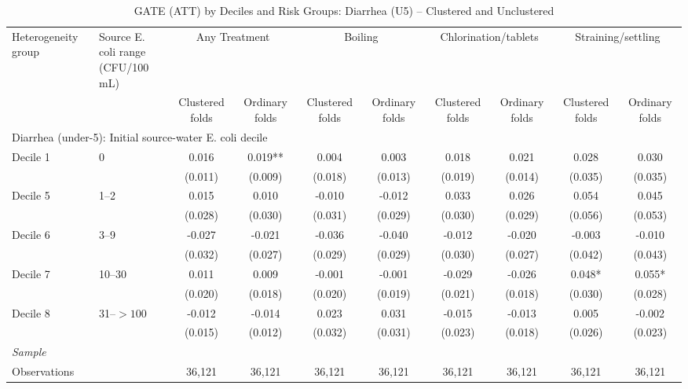 \begin{landscape}
\begin{table}[p]
\centering
\caption{GATE (ATT) by Deciles and Risk Groups: Diarrhea (U5) -- Clustered and Unclustered}
\label{tab:table_gate_appendix-diarrhea}
\scriptsize\setlength{\tabcolsep}{4pt}
\begin{adjustbox}{max width=\linewidth, center}
\begin{tabular}{llcccccccc}
\toprule
Heterogeneity group & \shortstack{Source E. coli range\\(CFU/100 mL)} & \multicolumn{2}{c}{Any Treatment} & \multicolumn{2}{c}{Boiling} & \multicolumn{2}{c}{Chlorination/tablets} & \multicolumn{2}{c}{Straining/settling} \\
 &  & Clustered folds & Ordinary folds & Clustered folds & Ordinary folds & Clustered folds & Ordinary folds & Clustered folds & Ordinary folds \\
\midrule
\multicolumn{10}{l}{Diarrhea (under-5): Initial source-water E. coli decile} \\
Decile 1 & 0 & 0.016 & 0.019** & 0.004 & 0.003 & 0.018 & 0.021 & 0.028 & 0.030 \\
 &  & (0.011) & (0.009) & (0.018) & (0.013) & (0.019) & (0.014) & (0.035) & (0.035) \\
Decile 5 & 1--2 & 0.015 & 0.010 & -0.010 & -0.012 & 0.033 & 0.026 & 0.054 & 0.045 \\
 &  & (0.028) & (0.030) & (0.031) & (0.029) & (0.030) & (0.029) & (0.056) & (0.053) \\
Decile 6 & 3--9 & -0.027 & -0.021 & -0.036 & -0.040 & -0.012 & -0.020 & -0.003 & -0.010 \\
 &  & (0.032) & (0.027) & (0.029) & (0.029) & (0.030) & (0.027) & (0.042) & (0.043) \\
Decile 7 & 10--30 & 0.011 & 0.009 & -0.001 & -0.001 & -0.029 & -0.026 & 0.048* & 0.055* \\
 &  & (0.020) & (0.018) & (0.020) & (0.019) & (0.021) & (0.018) & (0.030) & (0.028) \\
Decile 8 & 31--$>100$ & -0.012 & -0.014 & 0.023 & 0.031 & -0.015 & -0.013 & 0.005 & -0.002 \\
 &  & (0.015) & (0.012) & (0.032) & (0.031) & (0.023) & (0.018) & (0.026) & (0.023) \\
\multicolumn{10}{l}{\textit{Sample}} \\
\quad Observations &  & 36,121 & 36,121 & 36,121 & 36,121 & 36,121 & 36,121 & 36,121 & 36,121 \\

\end{tabular}
\end{adjustbox}
\end{table}
\end{landscape}
